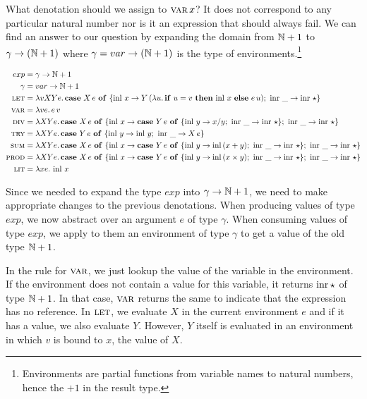What denotation should we assign to $\textsc{var}\,x$? It does not correspond to
any particular natural number nor is it an expression that should always fail. We
can find an answer to our question by expanding the domain from $\mathbb{N} + 1$
to $\gamma \to (\mathbb{N} + 1)$ where $\gamma = var \to (\mathbb{N} + 1)$ is the type of
environments.\footnote{Environments are partial functions from variable
  names to natural numbers, hence the $+ 1$ in the result type.}

\begin{align*}
  exp &= \gamma \to \mathbb{N} + 1 \\
  \gamma &= var \to \mathbb{N} + 1 \\
  \textsc{let} &= \lambda v X Y e.\, \text{\textbf{case} $X\,e$ \textbf{of} $\{ \operatorname{inl}\,x \to Y\,(\lambda u.\, \text{\textbf{if} $u = v$ \textbf{then} $\operatorname{inl}\,x$ \textbf{else} $e\,u$});\ \operatorname{inr}\,\_ \to \operatorname{inr}\,\star \}$} \\
  \textsc{var} &= \lambda v e.\, e\,v \\
  \textsc{div} &= \lambda X Y e.\, \text{\textbf{case} $X\,e$ \textbf{of} $\{ \operatorname{inl}\,x \to \text{\textbf{case} $Y\,e$ \textbf{of} $\{ \operatorname{inl}\,y \to x / y;\ \operatorname{inr}\,\_ \to \operatorname{inr}\,\star \}$};\ \operatorname{inr}\,\_ \to \operatorname{inr}\,\star \}$} \\ 
  \textsc{try} &= \lambda X Y e.\, \text{\textbf{case} $Y\,e$ \textbf{of} $\{ \operatorname{inl}\,y \to \operatorname{inl}\,y;\ \operatorname{inr}\,\_ \to X\,e \}$} \\ 
  \textsc{sum} &= \lambda X Y e.\, \text{\textbf{case} $X\,e$ \textbf{of} $\{ \operatorname{inl}\,x \to \text{\textbf{case} $Y\,e$ \textbf{of} $\{ \operatorname{inl}\,y \to \operatorname{inl}\,(x + y);\ \operatorname{inr}\,\_ \to \operatorname{inr}\,\star \}$};\ \operatorname{inr}\,\_ \to \operatorname{inr}\,\star \}$} \\ 
  \textsc{prod} &= \lambda X Y e.\, \text{\textbf{case} $X\,e$ \textbf{of} $\{ \operatorname{inl}\,x \to \text{\textbf{case} $Y\,e$ \textbf{of} $\{ \operatorname{inl}\,y \to \operatorname{inl}\,(x \times y);\ \operatorname{inr}\,\_ \to \operatorname{inr}\,\star \}$};\ \operatorname{inr}\,\_ \to \operatorname{inr}\,\star \}$} \\ 
  \textsc{lit} &= \lambda x e.\, \operatorname{inl}\,x
\end{align*}

Since we needed to expand the type $exp$ into $\gamma \to \mathbb{N} + 1$, we need
to make appropriate changes to the previous denotations. When producing
values of type $exp$, we now abstract over an argument $e$ of type
$\gamma$. When consuming values of type $exp$, we apply to them an
environment of type $\gamma$ to get a value of the old type $\mathbb{N} + 1$.

In the rule for $\textsc{var}$, we just lookup the value of the variable in the
environment. If the environment does not contain a value for this variable,
it returns $\operatorname{inr}{\star}$ of type $\mathbb{N} + 1$. In that case, $\textsc{var}$ returns
the same to indicate that the expression has no reference. In $\textsc{let}$, we
evaluate $X$ in the current environment $e$ and if it has a value, we also
evaluate $Y$. However, $Y$ itself is evaluated in an environment in which
$v$ is bound to $x$, the value of $X$.

